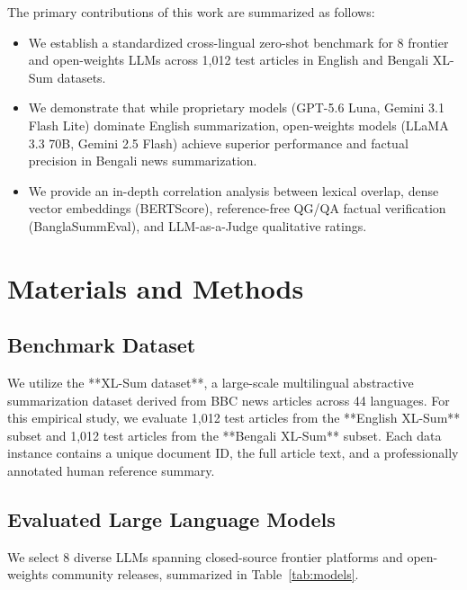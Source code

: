 \documentclass[runningheads]{llncs}
\begin{document}
The primary contributions of this work are summarized as follows:
\begin{itemize}
    \item We establish a standardized cross-lingual zero-shot benchmark for 8 frontier and open-weights LLMs across 1,012 test articles in English and Bengali XL-Sum datasets.
    \item We demonstrate that while proprietary models (GPT-5.6 Luna, Gemini 3.1 Flash Lite) dominate English summarization, open-weights models (LLaMA 3.3 70B, Gemini 2.5 Flash) achieve superior performance and factual precision in Bengali news summarization.
    \item We provide an in-depth correlation analysis between lexical overlap, dense vector embeddings (BERTScore), reference-free QG/QA factual verification (BanglaSummEval), and LLM-as-a-Judge qualitative ratings.
\end{itemize}

%
%
\section{Materials and Methods}\label{sec:methods}

\subsection{Benchmark Dataset}\label{subsec:dataset}

We utilize the **XL-Sum dataset**, a large-scale multilingual abstractive summarization dataset derived from BBC news articles across 44 languages. For this empirical study, we evaluate 1,012 test articles from the **English XL-Sum** subset and 1,012 test articles from the **Bengali XL-Sum** subset. Each data instance contains a unique document ID, the full article text, and a professionally annotated human reference summary.

\subsection{Evaluated Large Language Models}\label{subsec:models}

We select 8 diverse LLMs spanning closed-source frontier platforms and open-weights community releases, summarized in Table~\ref{tab:models}.
\end{document}
